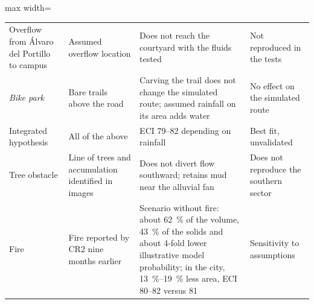 \begin{table}[htbp]
\begin{adjustbox}{max width=\textwidth}
\begin{tabular}{@{}>{\raggedright\arraybackslash}p{}>{\raggedright\arraybackslash}p{}>{\raggedright\arraybackslash}p{}>{\raggedright\arraybackslash}p{}@{}}
Overflow from Álvaro del Portillo to campus & Assumed overflow location & Does not reach the courtyard with the fluids tested & Not reproduced in the tests\\
\emph{Bike park} & Bare trails above the road & Carving the trail does not change the simulated route; assumed rainfall on its area adds water & No effect on the simulated route\\
Integrated hypothesis & All of the above & ECI 79--82 depending on rainfall & Best fit, unvalidated\\
Tree obstacle & Line of trees and accumulation identified in images & Does not divert flow southward; retains mud near the alluvial fan & Does not reproduce the southern sector\\
Fire & Fire reported by CR2 nine months earlier & Scenario without fire: about \SI{62}{\percent} of the volume, \SI{43}{\percent} of the solids and about 4-fold lower illustrative model probability; in the city, \SIrange{13}{19}{\percent} less area, ECI 80--82 versus 81 & Sensitivity to assumptions\\\bottomrule
\end{tabular}\end{adjustbox}
\end{table}
